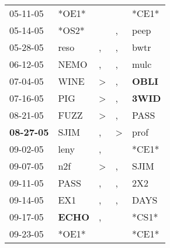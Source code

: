 \begin{supertabular}{p{0.07\textwidth}p{0.06\textwidth}p{0.02\textwidth}p{0.02\textwidth}p{0.06\textwidth}}
          05-11-05\textsuperscript{} &                            *OE1* &                  &                  &                            *CE1* \\
          05-14-05\textsuperscript{} &                            *OS2* &                  &                , &           peep\textsuperscript{} \\
          05-28-05\textsuperscript{} &           reso\textsuperscript{} &                , &                , &           bwtr\textsuperscript{} \\
          06-12-05\textsuperscript{} &           NEMO\textsuperscript{} &                , &                , &           mulc\textsuperscript{} \\
          07-04-05\textsuperscript{} &           WINE\textsuperscript{} &     \textgreater &                , &  \textbf{OBLI\textsuperscript{}} \\
          07-16-05\textsuperscript{} &            PIG\textsuperscript{} &     \textgreater &                , &  \textbf{3WID\textsuperscript{}} \\
          08-21-05\textsuperscript{} &           FUZZ\textsuperscript{} &     \textgreater &                , &           PASS\textsuperscript{} \\
 \textbf{08-27-05\textsuperscript{}} &           SJIM\textsuperscript{} &                , &     \textgreater &           prof\textsuperscript{} \\
          09-02-05\textsuperscript{} &           leny\textsuperscript{} &                , &                  &                            *CE1* \\
          09-07-05\textsuperscript{} &            n2f\textsuperscript{} &     \textgreater &                , &           SJIM\textsuperscript{} \\
          09-11-05\textsuperscript{} &           PASS\textsuperscript{} &                , &                , &            2X2\textsuperscript{} \\
          09-14-05\textsuperscript{} &            EX1\textsuperscript{} &                , &                , &           DAYS\textsuperscript{} \\
          09-17-05\textsuperscript{} &  \textbf{ECHO\textsuperscript{}} &                , &                  &                            *CS1* \\
          09-23-05\textsuperscript{} &                            *OE1* &                  &                  &                            *CE1* \\

\end{supertabular}

